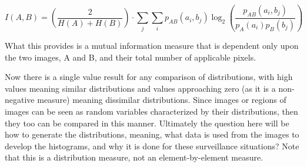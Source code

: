 \begin{equation}
\label{NormalizedMutualInformation}
	I(A,B) = \left( \frac{2}{H(A) + H(B)}\right) \cdot \sum_{j}{\sum_{i}{p_{AB}(a_{i},b_{j}) \log_{2}{\left( \frac{p_{AB}(a_{i},b_{j})}{p_{A}(a_{i})p_{B}(b_{j})}\right)}}}
\end{equation}

\noindent What this provides is a mutual information measure that is dependent only upon the two images, A and B, and their total number of applicable pixels.

Now there is a single value result for any comparison of distributions, with high values meaning similar distributions and values approaching zero (as it is a non-negative measure) meaning dissimilar distributions. Since images or regions of images can be seen as random variables characterized by their distributions, then they too can be compared in this manner. Ultimately the question here will be how to generate the distributions, meaning, what data is used from the images to develop the histograms, and why it is done for these surveillance situations? Note that this is a distribution measure, not an element-by-element measure.



